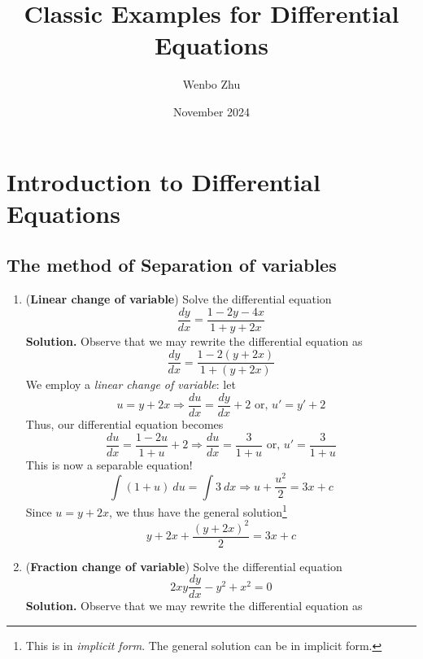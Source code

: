 \documentclass{article}
\title{Classic Examples for Differential Equations}
\author{Wenbo Zhu}
\date{November 2024}
\begin{document}
\maketitle

\section{Introduction to Differential Equations}
\subsection{The method of Separation of variables}
\begin{enumerate}
    \item (\textbf{Linear change of variable}) Solve the differential equation
    \begin{equation}
        \frac{dy}{dx}=\frac{1-2y-4x}{1+y+2x}
    \end{equation}
    \textbf{Solution.} Observe that we may rewrite the differential equation as
    \begin{equation*}
        \frac{dy}{dx}=\frac{1-2(y+2x)}{1+(y+2x)}
    \end{equation*}
    We employ a \textit{linear change of variable}: let
    \begin{equation*}
        u=y+2x\Rightarrow \frac{du}{dx}=\frac{dy}{dx}+2 \text{ or, }u'=y'+2
    \end{equation*}
    Thus, our differential equation becomes
    \begin{equation*}
        \frac{du}{dx}=\frac{1-2u}{1+u}+2\Rightarrow\frac{du}{dx}=\frac{3}{1+u} \text{ or, }u'=\frac{3}{1+u}
    \end{equation*}
    This is now a separable equation!
    \begin{equation*}
        \int(1+u)~du=\int3~dx\Rightarrow u+\frac{u^2}{2}=3x+c
    \end{equation*}
    Since $u=y+2x$, we thus have the general solution\footnote{This is in \textit{implicit form}. The general solution can be in implicit form.}
    \begin{equation*}
        y+2x+\frac{(y+2x)^2}{2}=3x+c
    \end{equation*}
    \newpage
    \item (\textbf{Fraction change of variable}) Solve the differential equation
    \begin{equation}
        2xy\frac{dy}{dx}-y^2+x^2=0
    \end{equation}
    \textbf{Solution.} Observe that we may rewrite the differential equation as

\end{enumerate}
\end{document}
